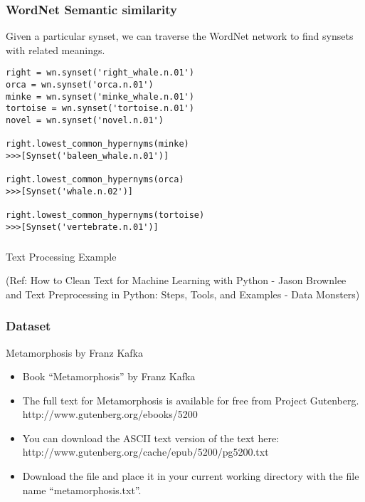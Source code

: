 \begin{frame}[fragile]
\frametitle{ WordNet Semantic similarity}
Given a particular synset, we can traverse the WordNet network to find synsets with related meanings.
\begin{lstlisting}
right = wn.synset('right_whale.n.01')
orca = wn.synset('orca.n.01')
minke = wn.synset('minke_whale.n.01')
tortoise = wn.synset('tortoise.n.01')
novel = wn.synset('novel.n.01')

right.lowest_common_hypernyms(minke)
>>>[Synset('baleen_whale.n.01')]

right.lowest_common_hypernyms(orca)
>>>[Synset('whale.n.02')]

right.lowest_common_hypernyms(tortoise)
>>>[Synset('vertebrate.n.01')]
\end{lstlisting}
\end{frame}

\begin{frame}[fragile]\frametitle{}

\begin{center}
{\Large Text Processing Example}
\end{center}

{\tiny (Ref: How to Clean Text for Machine Learning with Python - Jason Brownlee and Text Preprocessing in Python: Steps, Tools, and Examples - Data Monsters)}
\end{frame}

\begin{frame}[fragile]\frametitle{Dataset}
Metamorphosis by Franz Kafka
\begin{itemize}
\item Book ``Metamorphosis'' by Franz Kafka
\item The full text for Metamorphosis is available for free from Project Gutenberg. http://www.gutenberg.org/ebooks/5200
\item You can download the ASCII text version of the text here: http://www.gutenberg.org/cache/epub/5200/pg5200.txt
\item Download the file and place it in your current working directory with the file name ``metamorphosis.txt''.
\end{itemize}
\end{frame}

